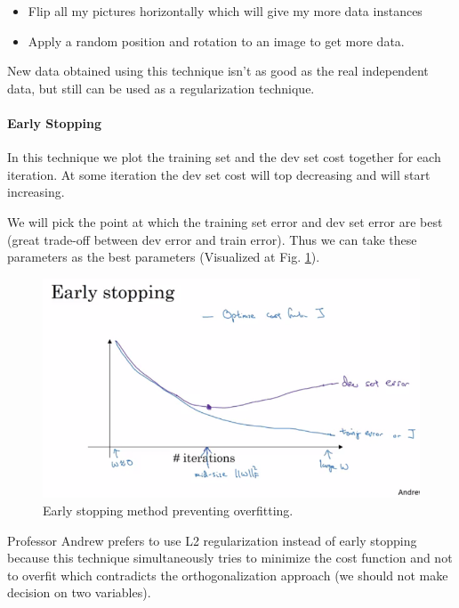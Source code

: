 \begin{itemize}
    \item Flip all my pictures horizontally which will give my more data instances
    \item Apply a random position and rotation to an image to get more data.
\end{itemize}

New data obtained using this technique isn't as good as the real independent data, but still can be used as a regularization technique.

\paragraph{Early Stopping}
In this technique we plot the training set and the dev set cost together for each iteration. At some iteration the dev set cost will top decreasing and will start increasing. 

We will pick the point at which the training set error and dev set error are best (great trade-off between dev error and train error). Thus we can take these parameters as the best parameters (Visualized at Fig. \ref{early-stopping}).

\begin{figure}[!htbp]
    \centering
    \includegraphics[width=1.0\textwidth, trim={30 30, 0 90}, clip]{img/c2/early-stopping.png}
    \caption{Early stopping method preventing overfitting.}
    \label{early-stopping}
\end{figure}

Professor Andrew prefers to use L2 regularization instead of early stopping because this technique simultaneously tries to minimize the cost function and not to overfit which contradicts the orthogonalization approach (we should not make decision on two variables).

